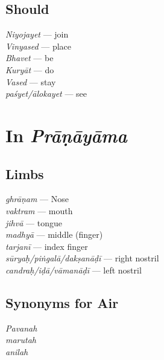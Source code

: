 \subsection*{Should}
\vspace{-10pt}

\begin{multicols}{2}
\textit{Niyojayet} --- join\\
\textit{Vinyased} --- place\\
\textit{Bhavet} --- be\\
\textit{Kuryāt} --- do \\
\textit{Vased} --- stay \\
\textit{paśyet/ālokayet} --- see 
\end{multicols}
\vspace{-10pt}

\section*{In  \textit{Prāṇāyāma}}
\vspace{-5pt}

\subsection*{Limbs}
\vspace{-10pt}

\begin{multicols}{2}
\textit{ghrāṇam} --- Nose\\
\textit{vaktram} --- mouth\\
\textit{jihvā} --- tongue\\
\textit{madhyā} --- middle (finger)\\
\textit{tarjanī} --- index finger\\
\textit{sūryaḥ/piṅgalā/dakṣanāḍī} --- right nostril\\
\textit{candraḥ/iḍā/vāmanāḍī} --- left nostril
\end{multicols}
\vspace{-10pt}

\subsection*{Synonyms for Air}
\vspace{-10pt}

\begin{multicols}{2}
\textit{Pavanah}\\
\textit{marutah}\\
\textit{anilah}
\end{multicols}
\vspace{-10pt}


